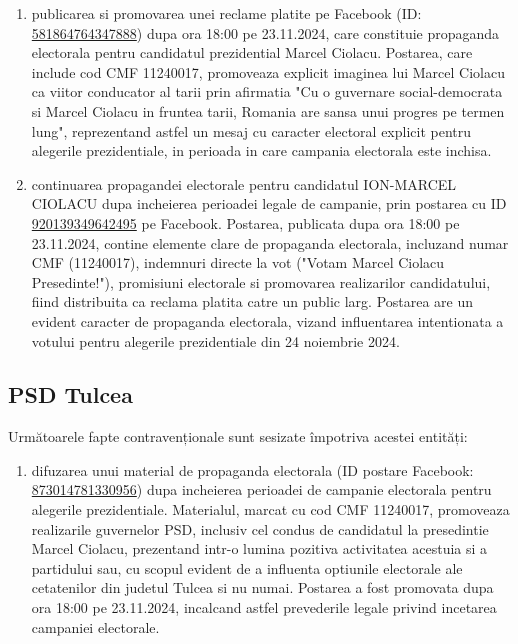 \documentclass[a4paper,12pt]{article}
\begin{document}
\begin{enumerate}[leftmargin=*, label=\arabic*.)]
    \item publicarea si promovarea unei reclame platite pe Facebook (ID: \href{https://www.facebook.com/ads/library/?id=581864764347888}{581864764347888}) dupa ora 18:00 pe 23.11.2024, care constituie propaganda electorala pentru candidatul prezidential Marcel Ciolacu. Postarea, care include cod CMF 11240017, promoveaza explicit imaginea lui Marcel Ciolacu ca viitor conducator al tarii prin afirmatia "Cu o guvernare social-democrata si Marcel Ciolacu in fruntea tarii, Romania are sansa unui progres pe termen lung", reprezentand astfel un mesaj cu caracter electoral explicit pentru alegerile prezidentiale, in perioada in care campania electorala este inchisa.
    \item continuarea propagandei electorale pentru candidatul ION-MARCEL CIOLACU dupa incheierea perioadei legale de campanie, prin postarea cu ID \href{https://www.facebook.com/ads/library/?id=920139349642495}{920139349642495} pe Facebook. Postarea, publicata dupa ora 18:00 pe 23.11.2024, contine elemente clare de propaganda electorala, incluzand numar CMF (11240017), indemnuri directe la vot ("Votam Marcel Ciolacu Presedinte!"), promisiuni electorale si promovarea realizarilor candidatului, fiind distribuita ca reclama platita catre un public larg. Postarea are un evident caracter de propaganda electorala, vizand influentarea intentionata a votului pentru alegerile prezidentiale din 24 noiembrie 2024.
\end{enumerate}

\vspace{0.5cm}

\subsection{PSD Tulcea}
Următoarele fapte contravenționale sunt sesizate împotriva acestei entități:

\begin{enumerate}[leftmargin=*, label=\arabic*.)]
    \item difuzarea unui material de propaganda electorala (ID postare Facebook: \href{https://www.facebook.com/ads/library/?id=873014781330956}{873014781330956}) dupa incheierea perioadei de campanie electorala pentru alegerile prezidentiale. Materialul, marcat cu cod CMF 11240017, promoveaza realizarile guvernelor PSD, inclusiv cel condus de candidatul la presedintie Marcel Ciolacu, prezentand intr-o lumina pozitiva activitatea acestuia si a partidului sau, cu scopul evident de a influenta optiunile electorale ale cetatenilor din judetul Tulcea si nu numai. Postarea a fost promovata dupa ora 18:00 pe 23.11.2024, incalcand astfel prevederile legale privind incetarea campaniei electorale.
\end{enumerate}
\end{document}
